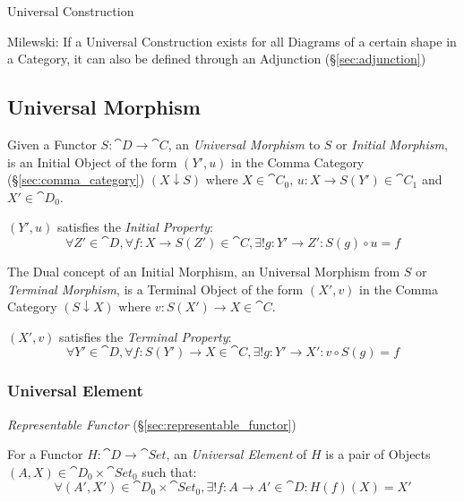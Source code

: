 Universal Construction

Milewski: If a Universal Construction exists for all Diagrams of a
certain shape in a Category, it can also be defined through an
Adjunction (\S\ref{sec:adjunction})



\subsection{Universal Morphism}\label{sec:universal_morphism}

Given a Functor $S: \cat{D} \rightarrow \cat{C}$, an
\emph{Universal Morphism} to $S$ or \emph{Initial Morphism}, is an
Initial Object of the form $(Y',u)$ in the Comma Category
(\S\ref{sec:comma_category}) $(X \downarrow S)$ where $X \in
\cat{C}_0$, $u : X \rightarrow S(Y') \in \cat{C}_1$ and $X' \in
\cat{D}_0$.

$(Y', u)$ satisfies the \emph{Initial Property}:
\[
  \forall Z' \in \cat{D}, \forall f : X \rightarrow S(Z') \in
  \cat{C}, \exists! g : Y' \rightarrow Z' : S(g) \circ u = f
\]

The Dual concept of an Initial Morphism, an Universal Morphism from
$S$ or \emph{Terminal Morphism}, is a Terminal Object of the form
$(X',v)$ in the Comma Category $(S \downarrow X)$ where $v : S(X')
\rightarrow X \in \cat{C}$.

$(X',v)$ satisfies the \emph{Terminal Property}:
\[
  \forall Y' \in \cat{D}, \forall f : S(Y') \rightarrow X \in
  \cat{C}, \exists! g : Y' \rightarrow X' : v \circ S(g) = f
\]




\subsubsection{Universal Element}\label{sec:universal_element}

\emph{Representable Functor} (\S\ref{sec:representable_functor})

For a Functor $H : \cat{D} \rightarrow \cat{Set}$, an
\emph{Universal Element} of $H$ is a pair of Objects $(A,X) \in
\cat{D}_0 \times \cat{Set}_0$ such that:
\[
  \forall (A',X') \in \cat{D}_0 \times \cat{Set}_0,
  \exists! f : A \rightarrow A' \in \cat{D} : H(f)(X) = X'
\]



